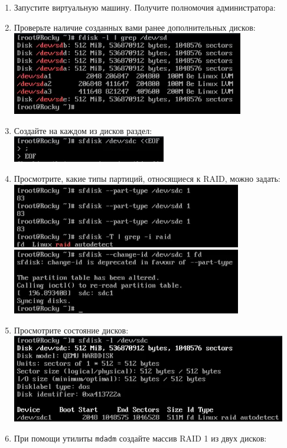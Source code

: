 \documentclass[12pt]{article}
\begin{document}
\begin{enumerate}
	\item Запустите виртуальную машину. Получите полномочия администратора:
	\item Проверьте наличие созданных вами ранее дополнительных дисков:
	      \\\includegraphics{1.png}
	\item Создайте на каждом из дисков раздел:
	      \\\includegraphics{2.png}
	\item Просмотрите, какие типы партиций, относящиеся к RAID, можно задать:
	      \\\includegraphics{3.png}
	      \\\includegraphics{4.png}
	\item Просмотрите состояние дисков:
	      \\\includegraphics{5.png}
	\item При помощи утилиты \texttt{mdadm} создайте массив RAID 1 из двух дисков:

\end{enumerate}
\end{document}
